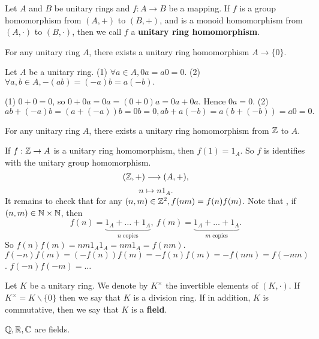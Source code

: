 \begin{definitionenv}
    Let $A$ and $B$ be unitary rings and $f:A\rightarrow B$ be a mapping. If $f$ is a group homomorphism from $(A, +)$ to $(B, +)$,  and is a monoid homomorphism from $(A, \cdot)$ to $(B, \cdot)$,  then we call $f$ a \textbf{unitary ring homomorphism}. 
\end{definitionenv}
\begin{propositionenv}
    For any unitary ring $A$,  there exists a unitary ring homomorphism $A\rightarrow\{0\}$.
\end{propositionenv}
\begin{lemmaenv}
    Let $A$ be a unitary ring.
    \newline
    (1) $\forall a\in A,  0a=a0=0.$
    \newline
    (2) $\forall a, b\in A,  -(ab)=(-a)b=a(-b).$
\end{lemmaenv}
\begin{proofenv}
    \quad\newline
    (1) $0+0=0$,  so $0+0a=0a=(0+0)a=0a+0a$. Hence $0a=0$.
    \newline
    (2) $ab+(-a)b=(a+(-a))b=0b=0, ab+a(-b)=a(b+(-b))=a0=0.$
\end{proofenv}
\begin{propositionenv}
    For any unitary ring $A$,  there exists a unitary ring homomorphism from $\mathbb{Z}$ to $A$.
\end{propositionenv}
\begin{proofenv}
    If $f:\mathbb{Z} \rightarrow A$ is a unitary ring homomorphism,  then $f(1)=1_A$. So $f$ is identifies with the unitary group homomorphism.
    $$(\mathbb{Z}, +)\longrightarrow(A, +), $$
    $$n\longmapsto n1_A.$$
    It remains to check that for any $(n, m)\in \mathbb{Z}^2, f(nm)=f(n)f(m)$. Note that ,  if $(n, m)\in \mathbb{N}\times\mathbb{N}$,  then 
    $$f(n)=\underset{n \text{ copies}}{\underbrace{1_A+\dots+1_A}}, \ f(m)=\underset{m \text{ copies}}{\underbrace{1_A+\dots+1_A}}.$$
    So $f(n)f(m)=nm1_A1_A=nm1_A=f(nm)$.
    $f(-n)f(m)=(-f(n))f(m)=-f(n)f(m)=-f(nm)=f(-nm)$.
    $f(-n)f(-m)=\dots$
\end{proofenv}
\begin{definitionenv}
    Let $K$ be a unitary ring. We denote by $K^\times$ the invertible elements of $(K, \cdot)$. If $K^\times=K\backslash\{0\}$ then we say that $K$ is a division ring. If in addition,  $K$ is commutative,  then we say that $K$ is a \textbf{field}.
\end{definitionenv}
\begin{exampleenv}
    $\mathbb{Q}, \mathbb{R}, \mathbb{C}$ are fields.
\end{exampleenv}
